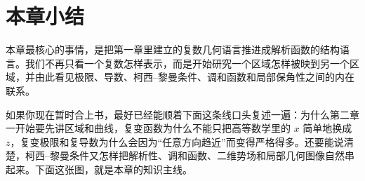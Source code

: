 \section{本章小结}

\begin{tishi}[一句话回看本章]
本章最核心的事情，是把第一章里建立的复数几何语言推进成解析函数的结构语言。我们不再只看一个复数怎样表示，而是开始研究一个区域怎样被映到另一个区域，并由此看见极限、导数、柯西--黎曼条件、调和函数和局部保角性之间的内在联系。
\end{tishi}

如果你现在暂时合上书，最好已经能顺着下面这条线口头复述一遍：为什么第二章一开始要先讲区域和曲线，复变函数为什么不能只把高等数学里的 $x$ 简单地换成 $z$，复变极限和复导数为什么会因为``任意方向趋近''而变得严格得多。还要能说清楚，柯西--黎曼条件又怎样把解析性、调和函数、二维势场和局部几何图像自然串起来。下面这张图，就是本章的知识主线。


